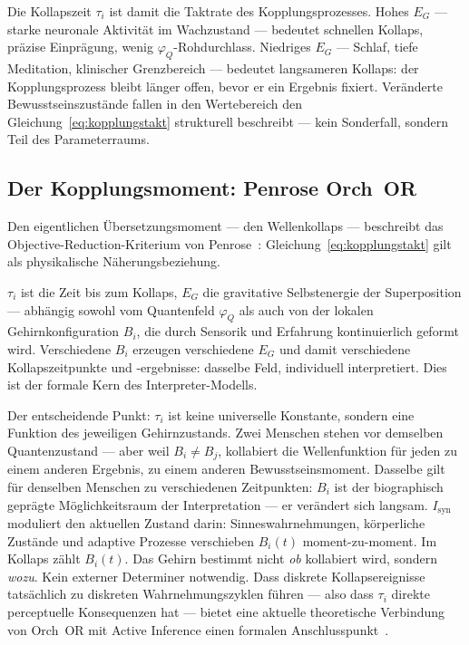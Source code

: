 \documentclass[11pt,a4paper]{article}
\begin{document}
Die Kollapszeit $\tau_i$ ist damit die Taktrate des Kopplungsprozesses.
Hohes $E_G$ — starke neuronale Aktivität im Wachzustand — bedeutet schnellen
Kollaps, präzise Einprägung, wenig $\varphi_Q$-Rohdurchlass. Niedriges $E_G$
— Schlaf, tiefe Meditation, klinischer Grenzbereich — bedeutet langsameren
Kollaps: der Kopplungsprozess bleibt länger offen, bevor er ein
Ergebnis fixiert. Veränderte Bewusstseinszustände fallen in den Wertebereich den Gleichung~\eqref{eq:kopplungstakt}
strukturell beschreibt — kein Sonderfall, sondern Teil des Parameterraums.

\subsection*{Der Kopplungsmoment: Penrose Orch~OR}

Den eigentlichen Übersetzungsmoment — den Wellenkollaps — beschreibt das
Objective-Reduction-Kriterium von Penrose~\citep{hameroff2014}:
Gleichung~\eqref{eq:kopplungstakt} gilt als physikalische Näherungsbeziehung.

$\tau_i$ ist die Zeit bis zum Kollaps, $E_G$ die gravitative Selbstenergie
der Superposition — abhängig sowohl vom Quantenfeld $\varphi_Q$ als auch von
der lokalen Gehirnkonfiguration $B_i$, die durch Sensorik und Erfahrung
kontinuierlich geformt wird. Verschiedene $B_i$ erzeugen verschiedene
$E_G$ und damit verschiedene Kollapszeitpunkte und -ergebnisse: dasselbe Feld,
individuell interpretiert. Dies ist der formale Kern des Interpreter-Modells.

Der entscheidende Punkt: $\tau_i$ ist keine universelle Konstante, sondern
eine Funktion des jeweiligen Gehirnzustands. Zwei Menschen stehen vor demselben
Quantenzustand — aber weil $B_i \neq B_j$, kollabiert die Wellenfunktion
für jeden zu einem anderen Ergebnis, zu einem anderen Bewusstseinsmoment.
Dasselbe gilt für denselben Menschen zu verschiedenen Zeitpunkten:
$B_i$ ist der biographisch geprägte Möglichkeitsraum der Interpretation —
er verändert sich langsam. $I_{\mathrm{syn}}$ moduliert den aktuellen Zustand
darin: Sinneswahrnehmungen, körperliche Zustände und adaptive Prozesse
verschieben $B_i(t)$ moment-zu-moment. Im Kollaps zählt $B_i(t)$.
Das Gehirn bestimmt nicht \emph{ob} kollabiert wird, sondern \emph{wozu}.
Kein externer Determiner notwendig. Dass diskrete Kollapsereignisse tatsächlich
zu diskreten Wahrnehmungszyklen führen — also dass $\tau_i$ direkte perceptuelle
Konsequenzen hat — bietet eine aktuelle theoretische Verbindung von Orch~OR mit
Active Inference einen formalen Anschlusspunkt~\citep{wiest2025active}.
\end{document}
